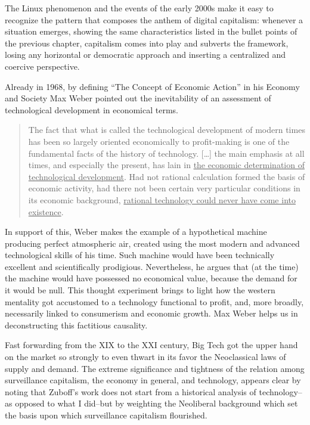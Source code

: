 \documentclass[
  a4paper,
]{book}
\begin{document}
The Linux phenomenon and the events of the early 2000s make it easy to recognize the pattern that composes the anthem of digital capitalism: whenever a situation emerges, showing the same characteristics listed in the bullet points of the previous chapter, capitalism comes into play and subverts the framework, losing any horizontal or democratic approach and inserting a centralized and coercive perspective.

Already in 1968, by defining ``The Concept of Economic Action'' in his Economy and Society Max Weber pointed out the inevitability of an assessment of technological development in economical terms.

\begin{quote}
The fact that what is called the technological development of modern times has been so largely oriented economically to profit-making is one of the fundamental facts of the history of technology. {[}\ldots{]} the main emphasis at all times, and especially the present, has lain in \uline{the economic determination of technological development}. Had not rational calculation formed the basis of economic activity, had there not been certain very particular conditions in its economic background, \uline{rational technology could never have come into existence}.
\end{quote}

In support of this, Weber makes the example of a hypothetical machine producing perfect atmospheric air, created using the most modern and advanced technological skills of his time. Such machine would have been technically excellent and scientifically prodigious. Nevertheless, he argues that (at the time) the machine would have possessed no economical value, because the demand for it would be null. This thought experiment brings to light how the western mentality got accustomed to a technology functional to profit, and, more broadly, necessarily linked to consumerism and economic growth. Max Weber helps us in deconstructing this factitious causality.

Fast forwarding from the XIX to the XXI century, Big Tech got the upper hand on the market so strongly to even thwart in its favor the Neoclassical laws of supply and demand. The extreme significance and tightness of the relation among surveillance capitalism, the economy in general, and technology, appears clear by noting that Zuboff's work does not start from a historical analysis of technology--as opposed to what I did--but by weighting the Neoliberal background which set the basis upon which surveillance capitalism flourished.
\end{document}
